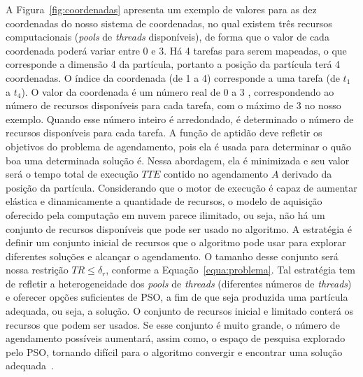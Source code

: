 \documentclass[sigconf]{acmart}
\begin{document}
A Figura~\ref{fig:coordenadas} apresenta um exemplo de valores para as dez coordenadas do nosso sistema de coordenadas, no qual existem três recursos computacionais (\emph{pools} de \emph{threads} disponíveis), de forma que o valor de cada coordenada poderá variar entre 0 e 3. Há 4 tarefas para serem mapeadas, o que corresponde a dimensão 4 da partícula, portanto a posição da partícula terá 4 coordenadas. O índice da coordenada (de 1 a 4) corresponde a uma tarefa (de $t_1$ a $t_{4}$). O valor da coordenada é um número real de 0 a 3 , correspondendo ao número de recursos disponíveis para cada tarefa, com o máximo de 3 no nosso exemplo. Quando esse número inteiro é arredondado, é determinado o número de recursos disponíveis para cada tarefa. 
A função de aptidão deve refletir os objetivos do problema de agendamento, pois ela é usada para determinar o quão boa uma determinada solução é. Nessa abordagem, ela é minimizada e seu valor será o tempo total de execução $TTE$ contido no agendamento $A$ derivado da posição da partícula. Considerando que o motor de execução é capaz de aumentar elástica e dinamicamente a quantidade de recursos, o modelo de aquisição oferecido pela computação em nuvem parece ilimitado, ou seja, não há um conjunto de recursos disponíveis que pode ser usado no algoritmo. A estratégia é definir um conjunto inicial de recursos que o algoritmo pode usar para explorar diferentes soluções e alcançar o agendamento. O tamanho desse conjunto será nossa restrição ${TR \le {\delta _r}} $, conforme a Equação~\ref{equa:problema}. Tal estratégia tem de refletir a heterogeneidade dos \emph{pools} de \emph{threads} (diferentes números de \emph{threads}) e oferecer opções suficientes de PSO, a fim de que seja produzida uma partícula adequada, ou seja, a solução. O conjunto de recursos inicial e limitado conterá os recursos que podem ser usados. Se esse conjunto é muito grande, o número de agendamento possíveis aumentará, assim como, o espaço de pesquisa explorado pelo PSO, tornando difícil para o algoritmo convergir e encontrar uma solução adequada~\cite{rodriguez2014}.
\end{document}
